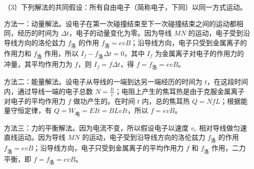 \documentclass[\gkver]{gaokaozhenti}
\begin{document}
\begin{enumerate}
{（3）下列解法的共同假设：所有自由电子（简称电子，下同）以同一方式运动。

方法一：动量解法。设电子在第一次碰撞结束至下一次碰撞结束之间的运动都相同，经历的时间为 $\Delta t$，电子的动量变化为零。因为导线 $MN$ 的运动，电子受到沿导线方向的洛伦兹力 $f_{\text{洛}}$ 的作用 $f_{\text{洛}}=evB$；沿导线方向，电子只受到金属离子的作用力和 $f_{\text{洛}}$ 作用，所以 $I_{f}-f_{\text{洛}}\Delta t=0$，其中 $I_{f}$ 为金属离子对电子的作用力的冲量，其平均作用力为 $f$，则 $I_{f}=f\Delta t$，得 $f=f_{\text{洛}}=evB$。

方法二：能量解法。设电子从导线的一端到达另一端经历的时间为 $t$，在这段时间内，通过导线一端的电子总数 $N=\frac{It}{e}$；电阻上产生的焦耳热是由于克服金属离子对电子的平均作用力 $f$ 做功产生的。在时间 $t$ 内，总的焦耳热 $Q=NfL$；根据能量守恒定律，有 $Q=W_{\text{电}}=EIt=BLvIt$，所以 $f=evB$。

方法三：力的平衡解法。因为电流不变，所以假设电子以速度 $v_{e}$ 相对导线做匀速直线运动。因为导线 $MN$ 的运动，电子受到沿导线方向的洛伦兹力 $f_{\text{洛}}$ 的作用 $f_{\text{洛}}=evB$；沿导线方向，电子只受到金属离子的平均作用力 $f$ 和 $f_{\text{洛}}$ 作用，二力平衡，即 $f=f_{\text{洛}}=evB$。
}

\end{enumerate}
\end{document}
